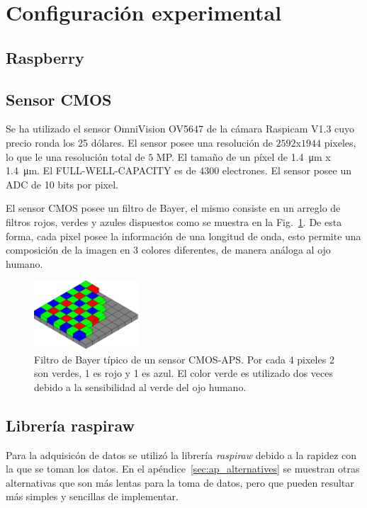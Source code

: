 \documentclass[twoside,twocolumn]{article}
\begin{document}
  \section{Configuración experimental}

    \subsection{Raspberry}

    \subsection{Sensor CMOS}
      Se ha utilizado el sensor OmniVision OV5647 de la cámara Raspicam V1.3 cuyo precio ronda los 25 dólares.
      El sensor posee una resolución de	$2592$x$1944$ pixeles, lo que le una resolución total de $5$ MP.
      El tamaño de un píxel de \SI{1.4}{\micro\meter} x \SI{1.4}{\micro\meter}.
      El FULL-WELL-CAPACITY es de $4300$ electrones. %
      El sensor posee un ADC de 10 bits por pixel.

      El sensor CMOS posee un filtro de Bayer, el mismo consiste en un arreglo de filtros rojos, verdes y azules
      dispuestos como se muestra en la Fig.~\ref{fig:bayer}. De esta forma, cada pixel posee la información de una longitud de onda,
      esto permite una composición de la imagen en 3 colores diferentes, de manera análoga al ojo humano.

      \begin{figure}[h]
        \includegraphics[width=0.35\textwidth]{figures/Bayer_pattern.png}
        \caption{Filtro de Bayer típico de un sensor CMOS-APS. Por cada 4 pixeles 2 son verdes, 1 es rojo y 1 es azul.
          El color verde es utilizado dos veces debido a la sensibilidad al verde del ojo humano.}
        \label{fig:bayer}
      \end{figure}

    \subsection{Librería raspiraw}
      Para la adquisicón de datos se utilizó la librería {\it raspiraw}\cite{raspiraw} debido a la rapidez con la que se toman los datos.
      En el apéndice~\ref{sec:ap_alternatives} se muestran otras alternativas que son más lentas para la toma de datos,
      pero que pueden resultar más simples y sencillas de implementar.
\end{document}
